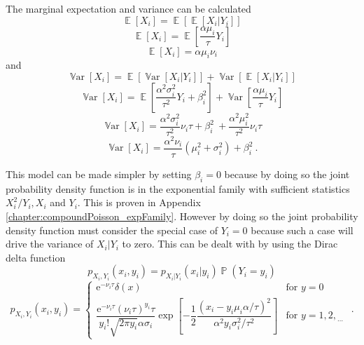 \documentclass[12pt]{report}
\DeclareMathOperator{\expectation}{\mathbb{E}}
\DeclareMathOperator{\variance}{\mathbb{V}ar}
\DeclareMathOperator{\prob}{\mathbb{P}}
\newcommand{\euler}{\mathrm{e}}
\newcommand{\dotdotdot}{_{\phantom{.}\cdots}}
\begin{document}
The marginal expectation and variance \cite[pp.~149-151]{rice2009mathematical} can be calculated
\begin{equation*}
\expectation[X_i]=\expectation[\expectation[X_i|Y_i]]
\end{equation*}
\begin{equation*}
\expectation[X_i]=\expectation\left[\frac{\alpha\mu_i}{\tau}Y_i\right]
\end{equation*}
\begin{equation}
\expectation[X_i] = \alpha \mu_i \nu_i
\end{equation}
and
\begin{equation*}
\variance[X_i] = \expectation[\variance[X_i|Y_i]] + \variance[\expectation[X_i|Y_i]]
\end{equation*}
\begin{equation*}
\variance[X_i] = \expectation\left[\frac{\alpha^2\sigma_i^2}{\tau^2}Y_i+\beta_i^2\right] + \variance\left[\frac{\alpha\mu_i}{\tau}Y_i\right]
\end{equation*}
\begin{equation*}
\variance[X_i] =
\frac{\alpha^2\sigma_i^2}{\tau^2}\nu_i\tau+\beta_i^2\
+\frac{\alpha^2\mu_i^2}{\tau^2}\nu_i\tau
\end{equation*}
\begin{equation}
\variance[X_i] = \frac{\alpha^2\nu_i}{\tau}\left(\mu_i^2+\sigma_i^2\right)+\beta_i^2 \ .
\end{equation}

This model can be made simpler by setting $\beta_i=0$ because by doing so the joint probability density function is in the exponential family with sufficient statistics $X_i^2/Y_i,X_i$ and $Y_i$. This is proven in Appendix \ref{chapter:compoundPoisson_expFamily}. However by doing so the joint probability density function must consider the special case of $Y_i=0$ because such a case will drive the variance of $X_i|Y_i$ to zero. This can be dealt with by using the Dirac delta function \cite[pp.~439-443]{riley2006mathematical}
\begin{equation*}
p_{X_i,Y_i}\left(x_i,y_i\right)=
p_{X_i|Y_i}(x_i|y_i)\prob(Y_i=y_i)
\end{equation*}
\begin{equation}
p_{X_i,Y_i}\left(x_i,y_i\right)=
\begin{cases}
\euler^{-\nu_i\tau}\delta(x) & \text{for }y=0
\\
\dfrac{\euler^{-\nu_i\tau}(\nu_i\tau)^{y_i}\tau}{y_i!\sqrt{2\pi y_i}\alpha\sigma_i}
\exp\left[-\dfrac{1}{2}\dfrac{\left(x_i-y_i\mu_i\alpha/\tau\right)^2}{\alpha^2y_i\sigma_i^2/\tau^2}\right] & \text{for }y=1,2,\dotdotdot
\end{cases} \ .
\end{equation}
\end{document}
